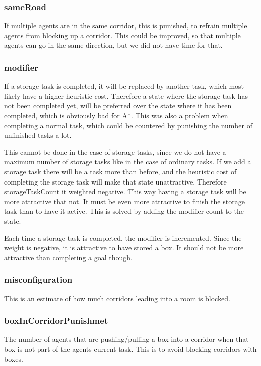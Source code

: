 \documentclass[letterpaper]{article}
\begin{document}
\subsubsection{sameRoad}
If multiple agents are in the same corridor, this is punished, to refrain multiple
agents from blocking up a corridor. This could be improved, so that multiple agents
can go in the same direction, but we did not have time for that.

\subsubsection{modifier}
If a storage task is completed, it will be replaced by another task, which most likely
have a higher heuristic cost. Therefore a state where the storage task has not been completed
yet, will be preferred over the state where it has been completed, which is obviously bad
for A*. This was also a problem when completing a normal task, which could be countered
by punishing the number of unfinished tasks a lot.

This cannot be done in the case of storage tasks, since we do not have a maximum number of
storage tasks like in the case of ordinary tasks. If we add a storage task there will be
a task more than before, and the heuristic cost of completing the storage task will make that
state unattractive. Therefore storageTaskCount it weighted negative. This way having a storage
task will be more attractive that not. It must be even more attractive to finish the storage
task than to have it active. This is solved by adding the modifier count to the state.

Each time a storage task is completed, the modifier is incremented. Since the weight is
negative, it is attractive to have stored a box. It should not be more attractive than
completing a goal though.

\subsubsection{misconfiguration}
This is an estimate of how much corridors leading into a room is blocked.

\subsubsection{boxInCorridorPunishmet}
The number of agents that are pushing/pulling a box into a corridor when that box
is not part of the agents current task. This is to avoid blocking corridors with boxes.
\end{document}
